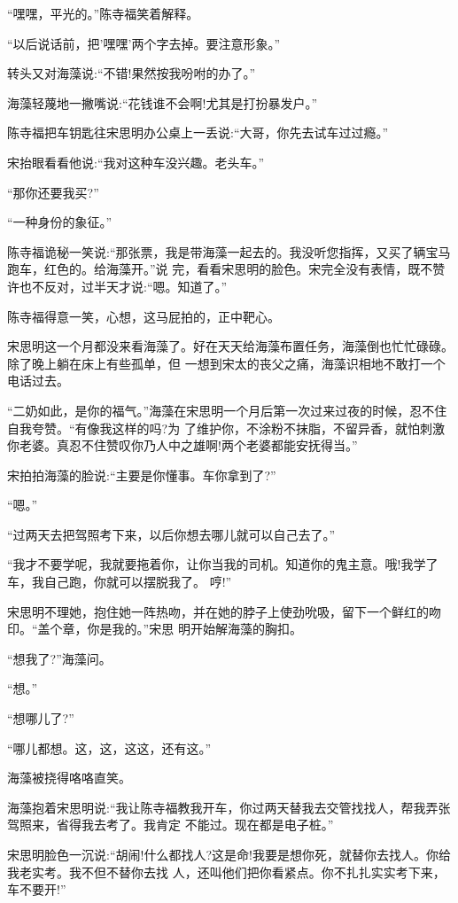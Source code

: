 \documentclass[11pt,a4paper,onecolumn]{article}
\begin{document}
``嘿嘿，平光的。''陈寺福笑着解释。

``以后说话前，把'嘿嘿'两个字去掉。要注意形象。''

转头又对海藻说:``不错!果然按我吩咐的办了。''

海藻轻蔑地一撇嘴说:``花钱谁不会啊!尤其是打扮暴发户。''

陈寺福把车钥匙往宋思明办公桌上一丢说:``大哥，你先去试车过过瘾。''

宋抬眼看看他说:``我对这种车没兴趣。老头车。''

``那你还要我买?''

``一种身份的象征。''

陈寺福诡秘一笑说:``那张票，我是带海藻一起去的。我没听您指挥，又买了辆宝马跑车，红色的。给海藻开。''说
完，看看宋思明的脸色。宋完全没有表情，既不赞许也不反对，过半天才说:``嗯。知道了。''

陈寺福得意一笑，心想，这马屁拍的，正中靶心。

宋思明这一个月都没来看海藻了。好在天天给海藻布置任务，海藻倒也忙忙碌碌。除了晚上躺在床上有些孤单，但
一想到宋太的丧父之痛，海藻识相地不敢打一个电话过去。

``二奶如此，是你的福气。''海藻在宋思明一个月后第一次过来过夜的时候，忍不住自我夸赞。``有像我这样的吗?为
了维护你，不涂粉不抹脂，不留异香，就怕刺激你老婆。真忍不住赞叹你乃人中之雄啊!两个老婆都能安抚得当。''

宋拍拍海藻的脸说:``主要是你懂事。车你拿到了?''

``嗯。''

``过两天去把驾照考下来，以后你想去哪儿就可以自己去了。''

``我才不要学呢，我就要拖着你，让你当我的司机。知道你的鬼主意。哦!我学了车，我自己跑，你就可以摆脱我了。
哼!''

宋思明不理她，抱住她一阵热吻，并在她的脖子上使劲吮吸，留下一个鲜红的吻印。``盖个章，你是我的。''宋思
明开始解海藻的胸扣。

``想我了?''海藻问。

``想。''

``想哪儿了?''

``哪儿都想。这，这，这这，还有这。''

海藻被挠得咯咯直笑。

海藻抱着宋思明说:``我让陈寺福教我开车，你过两天替我去交管找找人，帮我弄张驾照来，省得我去考了。我肯定
不能过。现在都是电子桩。''

宋思明脸色一沉说:``胡闹!什么都找人?这是命!我要是想你死，就替你去找人。你给我老实考。我不但不替你去找
人，还叫他们把你看紧点。你不扎扎实实考下来，车不要开!''
\end{document}
